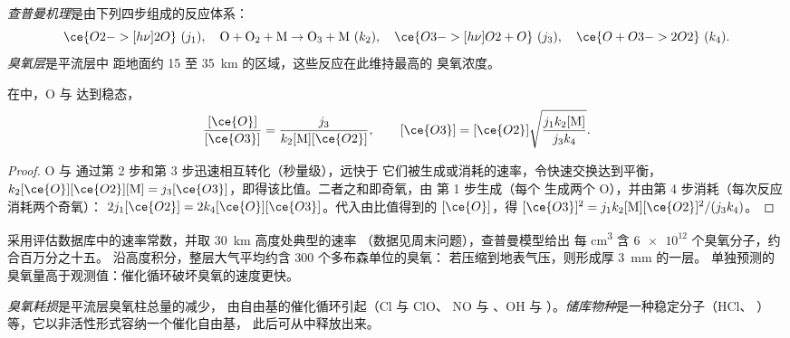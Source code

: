 \begin{definition}\label{def:b3:photochemistry:chapman}
\emph{查普曼机理}是由下列四步组成的反应体系：
\[
  \ce{O2 ->[h\nu] 2 O}\ (j_1), \quad \mathrm{O + O_2 + M \to O_3 + M}\ (k_2), \quad
  \ce{O3 ->[h\nu] O2 + O}\ (j_3), \quad \ce{O + O3 -> 2 O2}\ (k_4).
\]
\emph{臭氧层}是平流层中
距地面约 15 至 \qty{35}{km} 的区域，这些反应在此维持最高的
臭氧浓度。
\end{definition}

\begin{theorem}[查普曼稳态]\label{thm:b3:photochemistry:chapman}
在中，O 与  达到稳态，
\[
  \frac{[\ce{O}]}{[\ce{O3}]} = \frac{j_3}{k_2[\mathrm M][\ce{O2}]}, \qquad
  [\ce{O3}] = [\ce{O2}]\sqrt{\frac{j_1k_2[\mathrm M]}{j_3k_4}} .
\]
\end{theorem}

\begin{proof}
O 与  通过第 2 步和第 3 步迅速相互转化（秒量级），远快于
它们被生成或消耗的速率，令快速交换达到平衡，
$k_2[\ce{O}][\ce{O2}][\mathrm M] = j_3[\ce{O3}]$，即得该比值。二者之和即奇氧，由
第 1 步生成（每个  生成两个 O），并由第 4 步消耗（每次反应消耗两个奇氧）：
$2j_1[\ce{O2}] = 2k_4[\ce{O}][\ce{O3}]$。代入由比值得到的 $[\ce{O}]$，得 $[\ce{O3}]^2 = j_1k_2[\mathrm M][\ce{O2}]^2/(j_3k_4)$。
\end{proof}

采用评估数据库中的速率常数，并取 \qty{30}{km} 高度处典型的速率
（数据见周末问题），查普曼模型给出
每 \unit{cm^3} 含 $\num{6e12}$ 个臭氧分子，约合百万分之十五。
沿高度积分，整层大气平均约含 300 个多布森单位的臭氧：
若压缩到地表气压，则形成厚 \qty{3}{mm} 的一层。
单独预测的臭氧量高于观测值：催化循环破坏臭氧的速度更快。

\begin{definition}\label{def:b3:photochemistry:ozone-depletion}
\emph{臭氧耗损}是平流层臭氧柱总量的减少，
由自由基的催化循环引起（Cl 与 ClO、
NO 与 、OH 与 ）。\emph{储库物种}是一种稳定分子（HCl、
）等，它以非活性形式容纳一个催化自由基，
此后可从中释放出来。
\end{definition}

